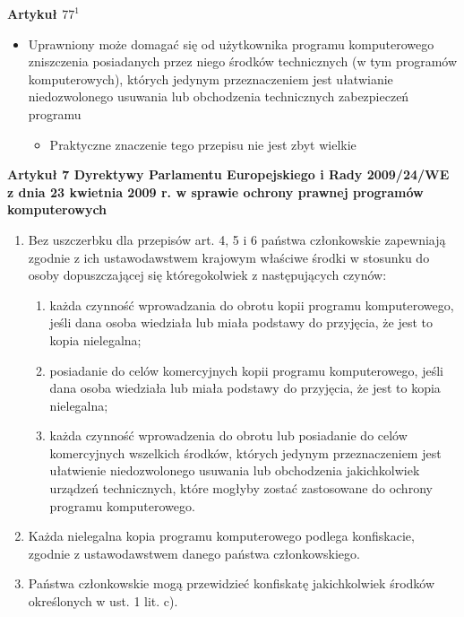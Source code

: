 \documentclass[12pt,a4paper]{article}
\begin{document}
\textbf{Artykuł $77^1$}
\begin{itemize}
\item Uprawniony może domagać się od użytkownika programu komputerowego zniszczenia posiadanych przez niego środków technicznych (w tym programów komputerowych), których jedynym przeznaczeniem jest ułatwianie niedozwolonego usuwania lub obchodzenia technicznych zabezpieczeń programu 
	\begin{itemize}
		\item Praktyczne znaczenie tego przepisu nie jest zbyt wielkie
	\end{itemize}
\end{itemize}
\textbf{Artykuł 7 Dyrektywy Parlamentu Europejskiego i Rady 2009/24/WE z dnia 23 kwietnia 2009 r. 
w sprawie ochrony prawnej programów komputerowych}
\begin{enumerate}
\item Bez uszczerbku dla przepisów art. 4, 5 i 6 państwa członkowskie zapewniają zgodnie z ich ustawodawstwem  krajowym  właściwe  środki  w  stosunku  do  osoby  dopuszczającej  się któregokolwiek z następujących czynów: 
	\begin{enumerate}
		\item  każda czynność wprowadzania do obrotu kopii programu komputerowego, jeśli dana osoba wiedziała lub miała podstawy do przyjęcia, że jest to kopia nielegalna; 
		\item posiadanie  do  celów  komercyjnych  kopii  programu  komputerowego,  jeśli  dana  osoba wiedziała lub miała podstawy do przyjęcia, że jest to kopia nielegalna; 
		\item  każda czynność wprowadzenia do obrotu lub posiadanie do celów komercyjnych wszelkich środków,  których  jedynym  przeznaczeniem  jest ułatwienie  niedozwolonego  usuwania  lub obchodzenia  jakichkolwiek  urządzeń  technicznych,  które  mogłyby  zostać  zastosowane  do ochrony programu komputerowego. 
	\end{enumerate}
\item Każda  nielegalna  kopia  programu  komputerowego  podlega  konfiskacie,  zgodnie  z ustawodawstwem danego państwa członkowskiego.
\item Państwa członkowskie mogą przewidzieć konfiskatę jakichkolwiek środków określonych 
w ust. 1 lit. c).
\end{enumerate}
\end{document}
